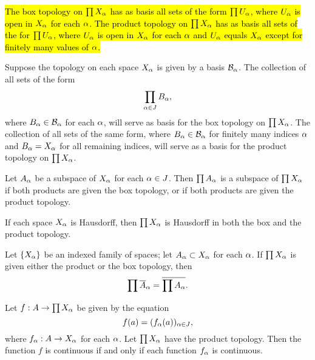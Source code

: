 \vs

\begin{thm}
\hl{The box topology on $\prod X_\alpha$ has as basis all sets of the form $\prod U_\alpha$, where $U_\alpha$ is open in $X_\alpha$ for each $\alpha$. The product topology on $\prod X_\alpha$ has as basis all sets of the for $\prod U_\alpha$, where $U_\alpha$ is open in $X_\alpha$ for each $\alpha$ and $U_\alpha$ equals $X_\alpha$ except for finitely many values of $\alpha$.}
\end{thm}

\vs

\begin{thm} Suppose the topology on each space $X_\alpha$ is given by a basis $\mathcal{B}_\alpha$. The collection of all sets of the form
\[\prod_{\alpha\in J} B_\alpha,\]
where $B_\alpha\in \mathcal{B}_\alpha$ for each $\alpha$, will serve as basis for the box topology on $\prod X_\alpha$. The collection of all sets of the same form, where $B_\alpha\in \mathcal{B}_\alpha$ for finitely many indices $\alpha$ and $B_\alpha = X_\alpha$ for all remaining indices, will serve as a basis for the product topology on $\prod X_\alpha$.
\end{thm}

\vs

\begin{thm}
Let $A_\alpha$ be a subspace of $X_\alpha$ for each $\alpha \in J$. Then $\prod A_\alpha$ is a subspace of $\prod X_\alpha$ if both products are given the box topology, or if both products are given the product topology.
\end{thm}

\vs

\begin{thm}
If each space $X_\alpha$ is Hausdorff, then $\prod X_\alpha$ is Hausdorff in both the box and the product topology.
\end{thm}

\vs

\begin{thm}
Let $\{X_\alpha\}$ be an indexed family of spaces; let $A_\alpha\subset X_\alpha$ for each $\alpha$. If $\prod X_\alpha$ is given either the product or the box topology, then
\[\prod \overline A_\alpha = \overline{\prod A_\alpha}.\]
\end{thm}

\vs

\begin{thm}
Let $f:A\rightarrow \prod X_\alpha$ be given by the equation
\[f(a) = (f_\alpha(a))_{\alpha\in J},\]
where $f_\alpha: A\rightarrow X_\alpha$ for each $\alpha$. Let $\prod X_\alpha$ have the product topology. Then the function $f$ is continuous if and only if each function $f_\alpha$ is continuous.
\end{thm}


